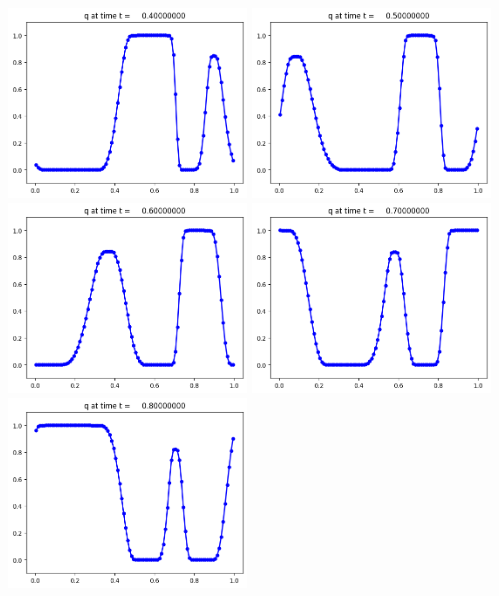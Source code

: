 \documentclass[11pt]{article}
\begin{document}
\vskip 10pt 
\includegraphics[width=0.475\textwidth]{frame0004fig1.png}
\includegraphics[width=0.475\textwidth]{frame0005fig1.png}
\vskip 10pt 
\includegraphics[width=0.475\textwidth]{frame0006fig1.png}
\includegraphics[width=0.475\textwidth]{frame0007fig1.png}
\vskip 10pt 
\includegraphics[width=0.475\textwidth]{frame0008fig1.png}
\end{document}
